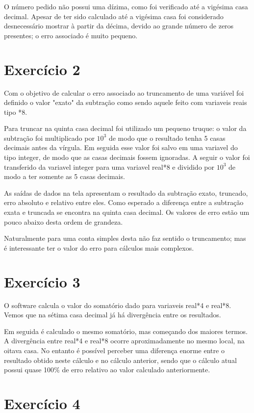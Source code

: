\documentclass[a4wide]{report}
\begin{document}
 O número pedido não possui uma dízima, como foi verificado até a vigésima casa decimal. Apesar de ter sido calculado até a vigésima casa foi considerado desnecessário mostrar à partir da décima, devido ao grande número de zeros presentes; o erro associado é muito pequeno.



\section*{Exercício 2}
Com o objetivo de calcular o erro associado ao truncamento de uma variável foi definido o valor "exato" da subtração como sendo aquele feito com variaveis reais tipo *8. 

Para truncar na quinta casa decimal foi utilizado um pequeno truque: o valor da subtração foi multiplicado por $10^{3}$ de modo que o resultado tenha 5 casas decimais antes da vírgula. Em seguida esse valor foi salvo em uma variavel do tipo integer, de modo que as casas decimais fossem ignoradas. A seguir o valor foi transferido da variavel integer para uma variavel real*8 e dividido por $10^{3}$ de modo a ter somente as 5 casas decimais.

As saídas de dados na tela apresentam o resultado da subtração exato, truncado, erro absoluto e relativo entre eles. Como esperado a diferença entre a subtração exata e truncada se encontra na quinta casa decimal. Os valores de erro estão um pouco abaixo desta ordem de grandeza.

Naturalmente para uma conta simples desta não faz sentido o truncamento; mas é interessante ter o valor do erro para cálculos mais complexos. 


\section*{Exercício 3}
O software calcula o valor do somatório dado para variaveis real*4 e real*8. Vemos que na sétima casa decimal já há divergência entre os resultados.

Em seguida é calculado o mesmo somatório, mas começando dos maiores termos. A divergência entre real*4 e real*8 ocorre aproximadamente no mesmo local, na oitava casa. No entanto é possível perceber uma diferença enorme entre o resultado obtido neste cálculo e no cálculo anterior, sendo que o cálculo atual possui quase 100$\%$ de erro relativo ao valor calculado anteriormente.


\section*{Exercício 4}
\end{document}
